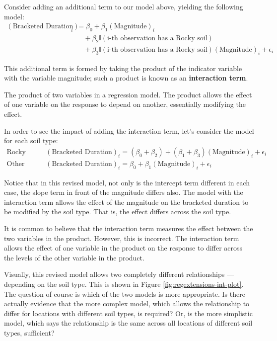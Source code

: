 \documentclass[]{book}
\theoremstyle{plain}
\theoremstyle{mydefn}
\theoremstyle{myexmpl}
\theoremstyle{remark}
\let\BeginKnitrBlock\begin \let\EndKnitrBlock\end
\let\BeginKnitrBlock\begin \let\EndKnitrBlock\end
\begin{document}
Consider adding an additional term to our model above, yielding the
following model: \[
\begin{aligned}
  (\text{Bracketed Duration})_i &= \beta_0 + \beta_1(\text{Magnitude})_i \\
    &\quad + \beta_2\mathbb{I}(\text{i-th observation has a Rocky soil}) \\
    &\quad + \beta_3\mathbb{I}(\text{i-th observation has a Rocky soil})(\text{Magnitude})_i + \epsilon_i
\end{aligned}
\]

This additional term is formed by taking the product of the indicator
variable with the variable magnitude; such a product is known as an
\textbf{interaction term}.

\BeginKnitrBlock{definition}[Interaction Term]
\protect\hypertarget{def:defn-interaction-term}{}{\label{def:defn-interaction-term}
{} }The product of two variables in a
regression model. The product allows the effect of one variable on the
response to depend on another, essentially modifying the effect.
\EndKnitrBlock{definition}

In order to see the impact of adding the interaction term, let's
consider the model for each soil type: \[
\begin{aligned}
  \text{Rocky Soil:} &\quad (\text{Bracketed Duration})_i = \left(\beta_0 + \beta_2\right) + \left(\beta_1 + \beta_3\right)(\text{Magnitude})_i + \epsilon_i\\
  \text{Other Soil:} &\quad (\text{Bracketed Duration})_i = \beta_0 + \beta_1(\text{Magnitude})_i + \epsilon_i
\end{aligned}
\]

Notice that in this revised model, not only is the intercept term
different in each case, the slope term in front of the magnitude differs
also. The model with the interaction term allows the effect of the
magnitude on the bracketed duration to be modified by the soil type.
That is, the effect differs across the soil type.

\BeginKnitrBlock{rmdtip}
It is common to believe that the interaction term measures the effect
between the two variables in the product. However, this is incorrect.
The interaction term allows the effect of one variable in the product on
the response to differ across the levels of the other variable in the
product.
\EndKnitrBlock{rmdtip}

Visually, this revised model allows two completely different
relationships --- depending on the soil type. This is shown in Figure
\ref{fig:regextensions-int-plot}. The question of course is which of the
two models is more appropriate. Is there actually evidence that the more
complex model, which allows the relationship to differ for locations
with different soil types, is required? Or, is the more simplistic
model, which says the relationship is the same across all locations of
different soil types, sufficient?
\end{document}
